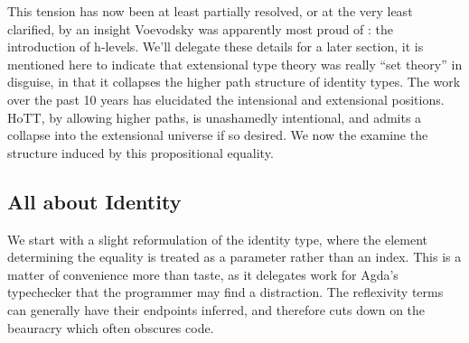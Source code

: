 This tension has now been at least partially resolved, or at the very least
clarified, by an insight Voevodsky was apparently most proud of : the
introduction of h-levels. We'll delegate these details for a later section, it
is mentioned here to indicate that extensional type theory was really ``set
theory'' in disguise, in that it collapses the higher path structure of
identity types. The work over the past 10 years has elucidated the intensional
and extensional positions. HoTT, by allowing higher paths, is unashamedly
intentional, and admits a collapse into the extensional universe if so desired.
We now the examine the structure induced by this propositional equality.

\subsection{All about Identity}

We start with a slight reformulation of the identity type, where the element
determining the equality is treated as a parameter rather than an index. This
is a matter of convenience more than taste, as it delegates work for Agda's
typechecker that the programmer may find a distraction. The reflexivity terms
can generally have their endpoints inferred, and therefore cuts down on the
beauracry which often obscures code. 

\begin{code}%
\>[0]\<%
\\
\>[0][@{}l@{\AgdaIndent{1}}]%
\>[2]\AgdaSpace{}%
\AgdaSpace{}%
\AgdaSymbol{\{}\AgdaSpace{}%
\AgdaSymbol{:}\AgdaSpace{}%
\AgdaSymbol{\}}\AgdaSpace{}%
\AgdaSymbol{(}\AgdaSpace{}%
\AgdaSymbol{:}\AgdaSpace{}%
\AgdaSymbol{)}\AgdaSpace{}%
\AgdaSymbol{:}\AgdaSpace{}%
\AgdaSpace{}%
\AgdaSpace{}%
\AgdaSpace{}%
\<%
\\
\>[2][@{}l@{\AgdaIndent{0}}]%
\>[4]\AgdaSpace{}%
\AgdaSymbol{:}\AgdaSpace{}%
\AgdaSpace{}%
\AgdaSpace{}%
\<%
\\
%
\\[\AgdaEmptyExtraSkip]%
%
\>[2]\AgdaSpace{}%
\AgdaSpace{}%
\<%
\\
\>[0]\<%
\end{code}

